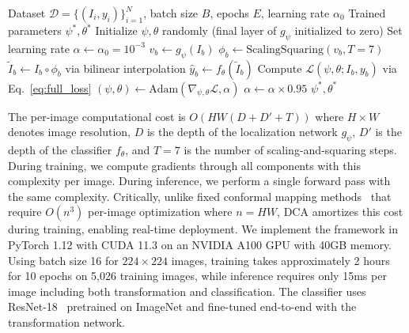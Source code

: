 \begin{algorithm}[t]
\caption{DCA Training Procedure}
\label{alg:training}
\begin{algorithmic}[1]
\REQUIRE Dataset $\mathcal{D} = \{(I_i, y_i)\}_{i=1}^N$, batch size $B$, epochs $E$, learning rate $\alpha_0$
\ENSURE Trained parameters $\psi^*, \theta^*$
\STATE Initialize $\psi, \theta$ randomly (final layer of $g_\psi$ initialized to zero)
\STATE Set learning rate $\alpha \leftarrow \alpha_0 = 10^{-3}$
        \STATE $v_b \leftarrow g_\psi(I_b)$
        \STATE $\phi_b \leftarrow \text{ScalingSquaring}(v_b, T=7)$
        \STATE $\tilde{I}_b \leftarrow I_b \circ \phi_b$ via bilinear interpolation
        \STATE $\hat{y}_b \leftarrow f_\theta(\tilde{I}_b)$
        \STATE Compute $\mathcal{L}(\psi, \theta; I_b, y_b)$ via Eq.~\eqref{eq:full_loss}
        \STATE $(\psi, \theta) \leftarrow \text{Adam}(\nabla_{\psi,\theta} \mathcal{L}, \alpha)$
    \ENDFOR
        \STATE $\alpha \leftarrow \alpha \times 0.95$
    \ENDIF
\ENDFOR
\RETURN $\psi^*, \theta^*$
\end{algorithmic}
\end{algorithm}

The per-image computational cost is $O(HW(D + D' + T))$ where $H \times W$ denotes image resolution, $D$ is the depth of the localization network $g_\psi$, $D'$ is the depth of the classifier $f_\theta$, and $T=7$ is the number of scaling-and-squaring steps. During training, we compute gradients through all components with this complexity per image. During inference, we perform a single forward pass with the same complexity. Critically, unlike fixed conformal mapping methods~\cite{huang2024surface} that require $O(n^3)$ per-image optimization where $n = HW$, DCA amortizes this cost during training, enabling real-time deployment. We implement the framework in PyTorch 1.12 with CUDA 11.3 on an NVIDIA A100 GPU with 40GB memory. Using batch size 16 for $224 \times 224$ images, training takes approximately 2 hours for 10 epochs on 5,026 training images, while inference requires only 15ms per image including both transformation and classification. The classifier uses ResNet-18~\cite{he2016resnet} pretrained on ImageNet and fine-tuned end-to-end with the transformation network.
